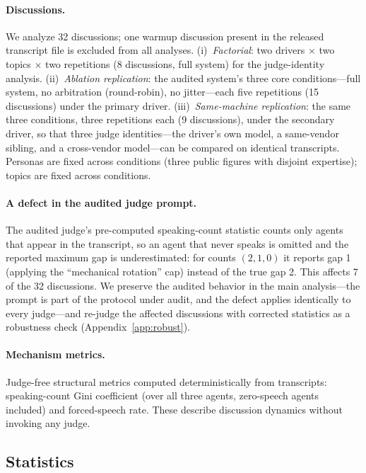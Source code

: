\paragraph{Discussions.} We analyze 32 discussions; one warmup
discussion present in the released transcript file is excluded from all
analyses. (i)~\emph{Factorial}: two drivers $\times$ two topics $\times$
two repetitions (8 discussions, full system) for the judge-identity
analysis. (ii)~\emph{Ablation replication}: the audited system's three
core conditions---full system, no arbitration (round-robin), no
jitter---each five repetitions (15 discussions) under the primary
driver. (iii)~\emph{Same-machine replication}: the same three
conditions, three repetitions each (9 discussions), under the secondary
driver, so that three judge identities---the driver's own model, a
same-vendor sibling, and a cross-vendor model---can be compared on
identical transcripts. Personas are fixed across conditions (three
public figures with disjoint expertise); topics are fixed across
conditions.

\paragraph{A defect in the audited judge prompt.} The audited judge's
pre-computed speaking-count statistic counts only agents that appear in
the transcript, so an agent that never speaks is omitted and the
reported maximum gap is underestimated: for counts $(2,1,0)$ it reports
gap 1 (applying the ``mechanical rotation'' cap) instead of the true
gap 2. This affects 7 of the 32 discussions. We preserve the audited
behavior in the main analysis---the prompt is part of the protocol under
audit, and the defect applies identically to every judge---and
re-judge the affected discussions with corrected statistics as a
robustness check (Appendix~\ref{app:robust}).

\paragraph{Mechanism metrics.} Judge-free structural metrics computed
deterministically from transcripts: speaking-count Gini coefficient
(over all three agents, zero-speech agents included) and
forced-speech rate. These describe discussion dynamics without invoking
any judge.

\subsection{Statistics}

